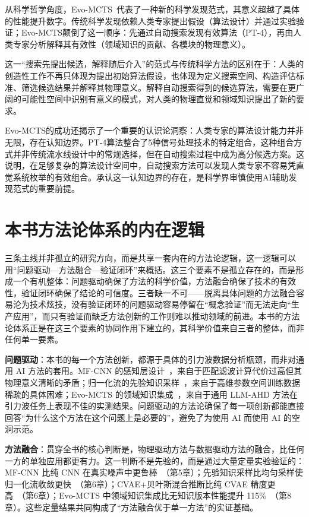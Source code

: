 从科学哲学角度，Evo-MCTS~\cite{wang2025evomcts}代表了一种新的科学发现范式，其意义超越了具体的性能提升数字。传统科学发现依赖人类专家提出假设（算法设计）并通过实验验证；Evo-MCTS颠倒了这一顺序：先通过自动搜索发现有效算法（PT-4），再由人类专家分析解释其有效性（领域知识的贡献、各模块的物理意义）。

这一“搜索先提出候选，解释随后介入”的范式与传统科学方法的区别在于：人类的创造性工作不再只体现为提出初始算法假设，也体现为定义搜索空间、构造评估标准、筛选候选结果并解释其物理意义。解释自动搜索得到的候选算法，需要在更广阔的可能性空间中识别有意义的模式，对人类的物理直觉和领域知识提出了新的要求。

Evo-MCTS的成功还揭示了一个重要的认识论洞察：人类专家的算法设计能力并非无限，存在认知边界。PT-4算法整合了5种信号处理技术的特定组合，这种组合方式并非传统流水线设计中的常规选择，但在自动搜索过程中成为高分候选方案。这说明，在足够复杂的算法设计空间中，自动搜索方法可以发现人类专家不容易凭直觉系统枚举的有效组合。承认这一认知边界的存在，是科学界审慎使用AI辅助发现范式的重要前提。

\section{本书方法论体系的内在逻辑}

三条主线并非孤立的研究方向，而是共享一套内在的方法论逻辑，这一逻辑可以用“问题驱动—方法融合—验证闭环”来概括。这三个要素不是孤立存在的，而是形成一个有机整体：问题驱动确保了方法的科学价值，方法融合确保了技术的有效性，验证闭环确保了结论的可信度。三者缺一不可——脱离具体问题的方法融合容易沦为技术炫技，没有验证闭环的问题驱动容易停留在“概念验证”而无法走向“生产应用”，而只有验证而缺乏方法创新的工作则难以推动领域的前进。本书的方法论体系正是在这三个要素的协同作用下建立的，其科学价值来自三者的整体，而非任何单一要素。

\textbf{问题驱动}：本书的每一个方法创新，都源于具体的引力波数据分析瓶颈，而非对通用 AI 方法的套用。MF-CNN 的感知层设计~\cite{wang2020deeplearning}，来自于匹配滤波计算代价过高但其物理意义清晰的矛盾；归一化流的先验知识采样~\cite{wang2022normflow}，来自于高维参数空间训练数据稀疏的具体困难；Evo-MCTS 的领域知识集成~\cite{wang2025evomcts}，来自于通用 LLM-AHD 方法在引力波任务上表现不佳的实测结果。问题驱动的方法论确保了每一项创新都能直接回答“为什么这个方法在这个问题上是必要的”，避免了为使用 AI 而使用 AI 的空洞示范。

\textbf{方法融合}：贯穿全书的核心判断是，物理驱动方法与数据驱动方法的融合，比任何一方的单独应用都更有力。这一判断不是先验的，而是通过大量定量实验验证的：MF-CNN 比纯 CNN 在真实噪声中更鲁棒~\cite{wang2020deeplearning}（第5章）；先验知识采样比均匀采样使归一化流收敛更快~\cite{wang2022normflow}（第6章）；CVAE+贝叶斯混合推断比纯 CVAE 精度更高~\cite{sun2025cvae}（第6章）；Evo-MCTS 中领域知识集成比无知识版本性能提升 115\%~\cite{wang2025evomcts}（第8章）。这些定量结果共同构成了“方法融合优于单一方法”的实证基础。

